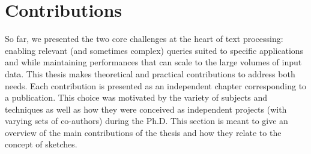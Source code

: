  \section{Contributions}\label{intro:sec:contrib}


So far, we presented the two core challenges at the heart of text processing: enabling relevant (and sometimes complex) queries suited to specific applications and while maintaining performances that can scale to the large volumes of input data.
%
This thesis makes theoretical and practical contributions to address both needs. 
Each contribution is presented as an independent chapter corresponding to a publication. This choice was motivated by the variety of subjects and techniques as well as how they were conceived as independent projects (with varying sets of co-authors) during the Ph.D. This section is meant to give an overview of the main contributions of the thesis and how they relate to the concept of sketches.



